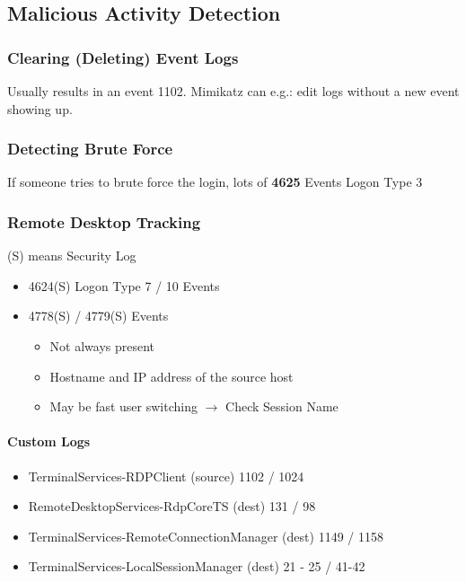 \subsection{Malicious Activity Detection}
\subsubsection{Clearing (Deleting) Event Logs}
Usually results in an event 1102. 
Mimikatz can e.g.: edit logs without a new event showing up.

\subsubsection{Detecting Brute Force}
If someone tries to brute force the login, lots of \textbf{4625} Events Logon Type 3

\subsubsection{Remote Desktop Tracking}
(S) means Security Log\\

\begin{itemize}
  \item 4624(S) Logon Type 7 / 10 Events
  \item 4778(S) / 4779(S) Events
  \begin{itemize}
    \item Not always present
    \item Hostname and IP address of the source host
    \item May be fast user switching $\rightarrow$ Check Session Name
  \end{itemize}
\end{itemize}

\paragraph{Custom Logs}
\begin{itemize}
  \item TerminalServices-RDPClient (source) 1102 / 1024
  \item RemoteDesktopServices-RdpCoreTS (dest) 131 / 98
  \item TerminalServices-RemoteConnectionManager (dest) 1149 / 1158
  \item TerminalServices-LocalSessionManager (dest) 21 - 25 / 41-42
\end{itemize}

